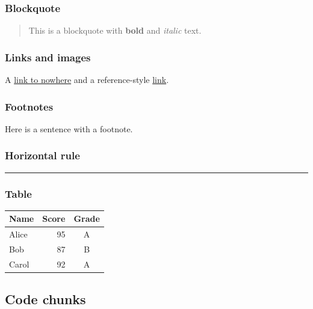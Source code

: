 \documentclass[11pt]{article}
\begin{document}
\subsubsection{Blockquote}
\label{blockquote}

\begin{quote}
This is a blockquote with \textbf{bold} and \emph{italic} text.

\end{quote}

\subsubsection{Links and images}
\label{links-and-images}

A \href{https://example.com}{link to nowhere} and a reference-style \href{https://example.com}{link}.


\subsubsection{Footnotes}
\label{footnotes}

Here is a sentence with a footnote\footnotemark[1].

\subsubsection{Horizontal rule}
\label{horizontal-rule}


\begin{center}\rule{0.5\linewidth}{0.4pt}\end{center}

\subsubsection{Table}
\label{sec-tables}

\begin{tabular}{lrc}
\hline
Name & Score & Grade \\
\hline
Alice & 95 & A \\
Bob & 87 & B \\
Carol & 92 & A \\
\hline
\end{tabular}

\subsection{Code chunks}
\label{code-chunks}
\end{document}
